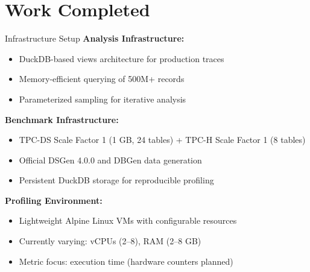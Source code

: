 \documentclass[aspectratio=169]{beamer}
\begin{document}
\section{Work Completed}

\begin{frame}{Infrastructure Setup}
    \textbf{Analysis Infrastructure:}
    \begin{itemize}
        \item DuckDB-based views architecture for production traces
        \item Memory-efficient querying of 500M+ records
        \item Parameterized sampling for iterative analysis
    \end{itemize}
    
    \vspace{0.4cm}
    \textbf{Benchmark Infrastructure:}
    \begin{itemize}
        \item TPC-DS Scale Factor 1 (1 GB, 24 tables) + TPC-H Scale Factor 1 (8 tables)
        \item Official DSGen 4.0.0 and DBGen data generation
        \item Persistent DuckDB storage for reproducible profiling
    \end{itemize}
    
    \vspace{0.4cm}
    \textbf{Profiling Environment:}
    \begin{itemize}
        \item Lightweight Alpine Linux VMs with configurable resources
        \item Currently varying: vCPUs (2--8), RAM (2--8 GB)
        \item Metric focus: execution time (hardware counters planned)
    \end{itemize}
\end{frame}
\end{document}
